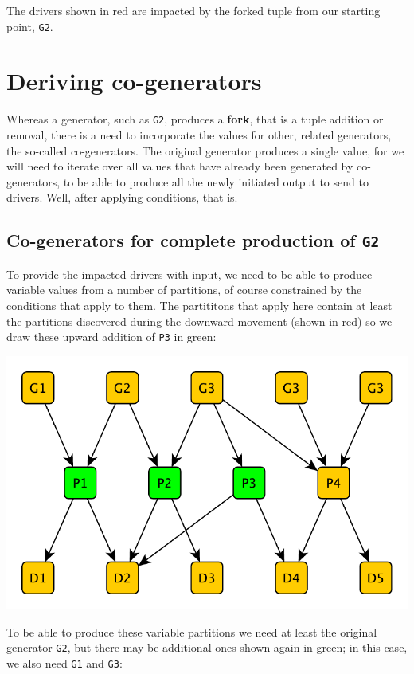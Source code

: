 \documentclass[a4paper]{article}
\def\G#1{\texttt{G#1}\xspace}
\def\P#1{\texttt{P#1}\xspace}
\begin{document}
The drivers shown in red are impacted by the forked tuple from our starting point, \G2.

\section{Deriving co-generators}

Whereas a generator, such as \G2, produces a \textbf{fork}, that is a tuple addition or removal, there is a need to incorporate the values for other, related generators, the so-called co-generators.  The original generator produces a single value, for we will need to iterate over all values that have already been generated by co-generators, to be able to produce all the newly initiated output to send to drivers.  Well, after applying conditions, that is.

\subsection{Co-generators for complete production of \G2}

To provide the impacted drivers with input, we need to be able to produce variable values from a number of partitions, of course constrained by the conditions that apply to them.  The partititons that apply here contain at least the partitions discovered during the downward movement (shown in red) so we draw these upward addition of \P3 in green:

\centerline{\includegraphics[scale=0.5]{img/network4-varsneeded.pdf}}

To be able to produce these variable partitions we need at least the original generator \G2, but there may be additional ones shown again in green; in this case, we also need \G1 and \G3:
\end{document}
